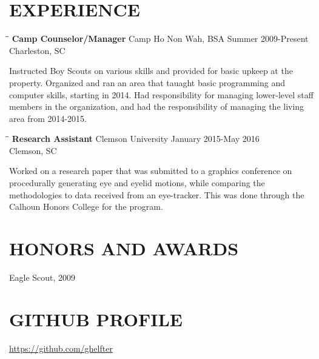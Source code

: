 \documentclass{res}
\begin{document}
\begin{resume}
\section{EXPERIENCE}
    \vspace{-0.1in}	
    \begin{tabbing}
    \hspace{2.3in}\= \hspace{2.6in}\= \kill %
     {\bf Camp Counselor/Manager} \>Camp Ho Non Wah, BSA \>Summer 2009-Present\\
                             \>Charleston, SC
    \end{tabbing}\vspace{-20pt}      %
      Instructed Boy Scouts on various skills and provided for basic upkeep
      at the property. Organized and ran an area that tauaght basic programming
      and computer skills, starting in 2014. Had responsibility for managing
      lower-level staff members in the organization, and had the responsibility
      of managing the living area from 2014-2015.

    \vspace{-0.1in}	
    \begin{tabbing}
    \hspace{2.3in}\= \hspace{2.6in}\= \kill %
     {\bf Research Assistant} \>Clemson University
     \>January
     2015-May 2016\\
                             \>Clemson, SC
    \end{tabbing}\vspace{-20pt}      %
      Worked on a research paper that was submitted to a graphics conference
      on procedurally generating eye and eyelid motions, while comparing the
      methodologies to data received from an eye-tracker. This was done through
      the Calhoun Honors College for the program.

\section{HONORS AND AWARDS}          
    Eagle Scout, 2009 \\

\section{GITHUB PROFILE}
    \url{https://github.com/ghelfter}
    
\end{resume}
\end{document}
